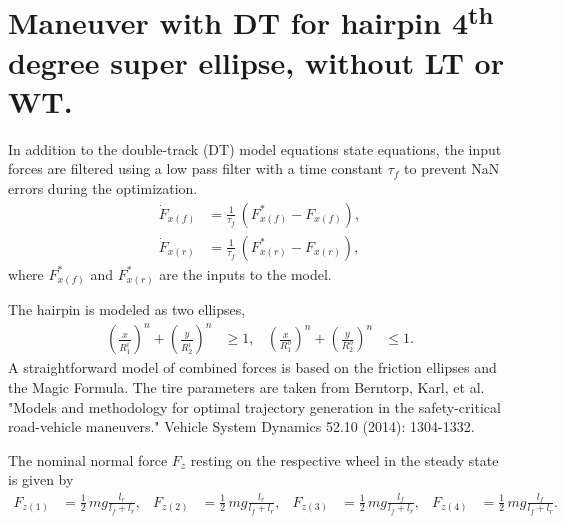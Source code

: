 \chapter[Double-Track Maneuver Optimization]{Maneuver with DT for hairpin 4\textsuperscript{th} degree super ellipse, without LT or WT.}

In addition to the double-track (DT) model equations state equations,
the input forces are filtered using a low pass filter with a time constant $\tau_f$ to prevent NaN errors during the optimization.
\begin{align}
    \dot F_{x(f)} &= \frac{1}{\tau_f}\,\left(F_{x(f)}^* - F_{x(f)}\right),\\
    \dot F_{x(r)} &= \frac{1}{\tau_f}\,\left(F_{x(r)}^* - F_{x(r)}\right),
\end{align}
where $F_{x(f)}^*$ and $F_{x(r)}^*$ are the inputs to the model.

The hairpin is modeled as two ellipses,
\begin{align}
    \left(\frac{x}{R_1^i}\right)^n + \left(\frac{y}{R_2^i}\right)^n & \geq 1, & \left(\frac{x}{R_1^o}\right)^n + \left(\frac{y}{R_2^o}\right)^n & \leq 1.
\end{align}
A straightforward model of combined forces is based on the friction ellipses and the Magic Formula. The tire parameters are taken from Berntorp, Karl, et al. "Models and methodology for optimal trajectory generation in the safety-critical road-vehicle maneuvers." Vehicle System Dynamics 52.10 (2014): 1304-1332.

The nominal normal force $F_z$ resting on the respective wheel in the steady state is given by
\begin{align}
    F_{z(1)} &= \frac{1}{2}\,mg\frac{l_r}{l_f+l_r}, & F_{z(2)} &= \frac{1}{2}\,mg\frac{l_r}{l_f+l_r}, & F_{z(3)} &= \frac{1}{2}\,mg\frac{l_f}{l_f+l_r}, & F_{z(4)} &= \frac{1}{2}\,mg\frac{l_f}{l_f+l_r}. \label{eq:prob2_maxforce_DT}
\end{align}

